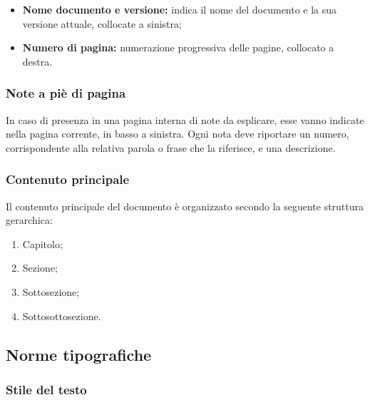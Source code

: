 \documentclass[../NormediProgetto.tex]{subfiles}
\begin{document}
\begin{itemize}
	\item \textbf{Nome documento e versione:} indica il nome del documento e la sua versione attuale, collocate a sinistra;
	\item \textbf{Numero di pagina:} numerazione progressiva delle pagine, collocato a destra.
\end{itemize}

\subsubsection{Note a piè di pagina}

In caso di presenza in una pagina interna di note da esplicare, esse vanno indicate nella pagina corrente, in basso a sinistra. Ogni nota deve riportare un numero, corrispondente alla relativa parola o frase che la riferisce, e una descrizione.

\subsubsection{Contenuto principale}

Il contenuto principale del documento è organizzato secondo la seguente struttura gerarchica:

\begin{enumerate}
	\item Capitolo;
	\item Sezione;
	\item Sottosezione;
	\item Sottosottosezione.
\end{enumerate}


\subsection{Norme tipografiche}

\subsubsection{Stile del testo}
\end{document}

